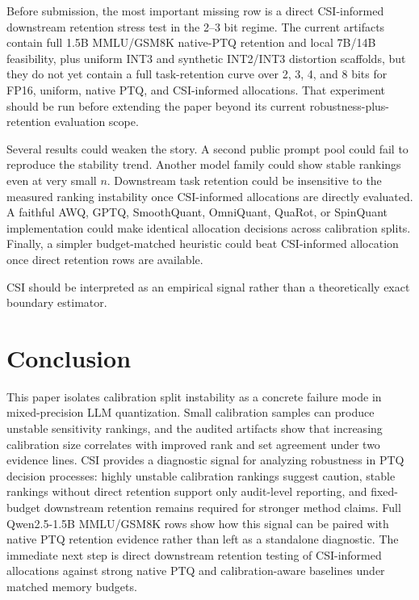 \documentclass[letterpaper]{article}
\begin{document}
Before submission, the most important missing row is a direct CSI-informed
downstream retention stress test in the 2--3 bit regime. The current artifacts
contain full 1.5B MMLU/GSM8K native-PTQ retention and local 7B/14B feasibility,
plus uniform INT3 and synthetic INT2/INT3 distortion scaffolds, but they do not
yet contain a full task-retention curve over 2, 3, 4, and 8 bits for FP16,
uniform, native PTQ, and CSI-informed allocations. That experiment should be
run before extending the paper beyond its current robustness-plus-retention
evaluation scope.

Several results could weaken the story. A second public prompt pool could fail
to reproduce the stability trend. Another model family could show stable
rankings even at very small $n$. Downstream task retention could be insensitive
to the measured ranking instability once CSI-informed allocations are directly
evaluated. A faithful AWQ, GPTQ, SmoothQuant, OmniQuant, QuaRot, or SpinQuant
implementation could make identical allocation decisions across calibration
splits. Finally, a simpler budget-matched heuristic could beat CSI-informed
allocation once direct retention rows are available.

CSI should be interpreted as an empirical signal rather than a theoretically
exact boundary estimator.

\section{Conclusion}

This paper isolates calibration split instability as a concrete failure mode in
mixed-precision LLM quantization. Small calibration samples can produce
unstable sensitivity rankings, and the audited artifacts show that increasing
calibration size correlates with improved rank and set agreement under two
evidence lines. CSI provides a diagnostic signal for analyzing robustness in PTQ
decision processes: highly unstable calibration rankings suggest caution,
stable rankings without direct retention support only audit-level reporting,
and fixed-budget downstream retention remains required for stronger method
claims. Full Qwen2.5-1.5B MMLU/GSM8K rows show how this signal can be paired
with native PTQ retention evidence rather than left as a standalone diagnostic.
The immediate next step is direct downstream retention testing of CSI-informed
allocations against strong native PTQ and calibration-aware baselines under
matched memory budgets.


\end{document}
